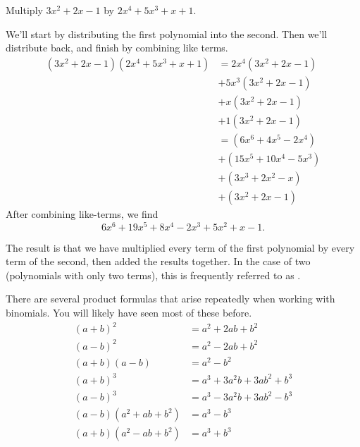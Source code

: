 \documentclass{ximera}
\begin{document}
\begin{example}
	Multiply $3x^2 + 2x - 1$ by $2x^4 + 5x^3+ x + 1$.
	\begin{explanation}
		We'll start by distributing the first polynomial into the second.  Then we'll distribute back, and finish by combining like terms.
		\begin{align*}
			(3x^2+ 2x-1)(2x^4 + 5x^3 + x +1) &= 2x^4(3x^2+ 2x-1) \\
			 &+ 5x^3 (3x^2+ 2x-1) \\
			 &+ x (3x^2+ 2x-1) \\
			 &+ 1(3x^2+ 2x-1)\\
				&= (6x^6 + 4x^5 - 2x^4) \\
				&+ (15x^5 + 10x^4 - 5x^3) \\
				&+ (3x^3+2x^2-x) \\
				&+(3x^2+2x-1)
		\end{align*}
		After combining like-terms, we find \[6x^6 + 19x^5 +8x^4 - 2x^3 + 5x^2+ x - 1.\]
	\end{explanation}
\end{example}
The result is that we have multiplied every term of the first polynomial by every term of the second, then added the results together.  In the case of two
 (polynomials with only two terms), this is frequently referred to as .

There are several product formulas that arise repeatedly when working with binomials.  You will likely have seen most of these before.
		\begin{align*}
			(a + b)^2 &= a^2 + 2ab + b^2\\
			(a-b)^2 &= a^2 - 2ab + b^2\\
			(a+b)(a-b) &= a^2 - b^2\\
			(a+b)^3 &= a^3 + 3 a^2 b + 3 ab^2 + b^3\\
			(a-b)^3 &= a^3 - 3 a^2 b + 3 ab^2 - b^3\\
			(a-b)(a^2 + ab + b^2) &= a^3 - b^3\\
			(a+b)(a^2-ab+b^2) &= a^3 + b^3
		\end{align*}
\end{document}
